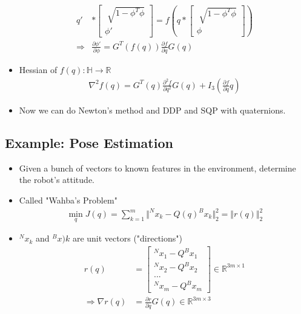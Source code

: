 \begin{itemize}
\begin{align}
        q' &* \begin{bmatrix}
            \sqrt[]{1- \phi^T \phi} \\ \phi'
        \end{bmatrix} = 
        f(q * \begin{bmatrix}
            \sqrt[]{1- \phi^T \phi} \\ \phi
        \end{bmatrix}) \\
        \Rightarrow & \frac{\partial \phi'}{\partial \phi} = G^T(f(q)) \frac{\partial f}{\partial q} G(q)
    \end{align}
    \item Hessian of $f(q): \mathbb{H} \to \mathbb{R}$
    \begin{align}
        \nabla^2 f(q) = G^T(q) \frac{\partial^2 f}{\partial q^2} G(q) + I_3 (\frac{\partial f}{\partial q} q)
    \end{align}
    \item Now we can do Newton's method and DDP and SQP with quaternions.
\end{itemize}

\subsection{Example: Pose Estimation}

\begin{itemize}
    \item Given a bunch of vectors to known features in the environment, determine the robot's attitude.
    \item Called "Wahba's Problem"
    \begin{align}
        \min_q J(q) = \sum_{k=1}^m \Vert ^N x_k - Q(q) ^Bx_k \Vert_2^2 = \Vert r(q) \Vert_2^2
    \end{align}
    \item $^N x_k$ and $^B x)k$ are unit vectors ("directions")
    \begin{align}
        r(q) & = 
        \begin{bmatrix}
            ^N x_1 - Q ^B x_1 \\
            ^N x_2 - Q ^B x_2 \\
            ...\\
            ^N x_m - Q ^B x_m 
        \end{bmatrix} \in \mathbb{R}^{3m \times 1} \\
        \Rightarrow 
        \nabla r(q) & =  \frac{\partial r}{\partial q} G(q) \in \mathbb{R}^{3m \times 3}
    \end{align}
\end{itemize}

